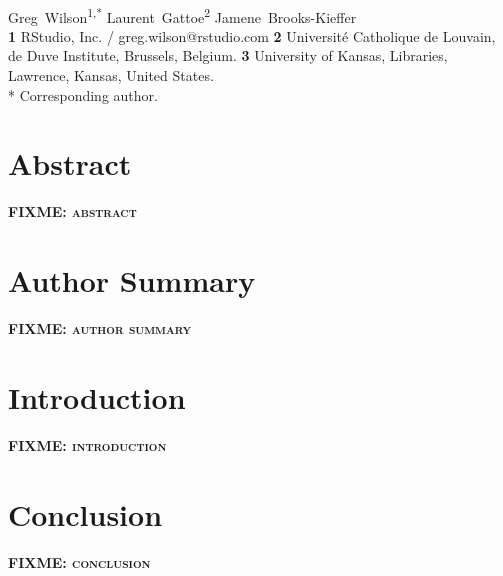 \documentclass[10pt,letterpaper]{article}
\newcommand{\fixme}[1]{\textsc{\textbf{FIXME: {#1}}}}
\begin{document}
\vspace*{0.2in}

\begin{flushleft}
{\Large
\textbf{}
}
\newline
\\
{Greg~Wilson}\textsuperscript{1,*}
{Laurent~Gattoe}\textsuperscript{2}
{Jamene~Brooks-Kieffer}
\\
\textbf{1} RStudio, Inc. / greg.wilson@rstudio.com
\textbf{2} Université Catholique de Louvain, de Duve Institute, Brussels, Belgium.
\textbf{3} University of Kansas, Libraries, Lawrence, Kansas, United States.
\\
\bigskip
* Corresponding author.
\end{flushleft}

\section*{Abstract}

\fixme{abstract}

\section*{Author Summary}

\fixme{author summary}

\section*{Introduction}

\fixme{introduction}

\section*{Conclusion}

\fixme{conclusion}

\nocite{*} %

\end{document}
